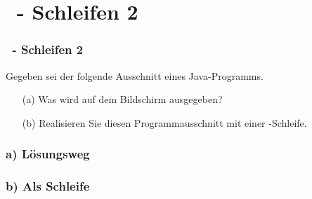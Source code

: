\def\stitle{\theexercise\ - Schleifen 2}
\section{\stitle}
\begin{frame}[t]%
    \frametitle{\stitle}
\medskip

Gegeben sei der folgende Ausschnitt eines Java-Programms.



\begin{itemize}
\item[(a)] Was wird auf dem Bildschirm ausgegeben?
\item[(b)] Realisieren Sie diesen Programmausschnitt mit einer -Schleife.
\end{itemize}
\end{frame}


\begin{frame}[fragile]%
 \frametitle{a) L\"osungsweg}%

\end{frame}


\begin{frame}[fragile]%
 \frametitle{b) Als  Schleife}%

\end{frame}
